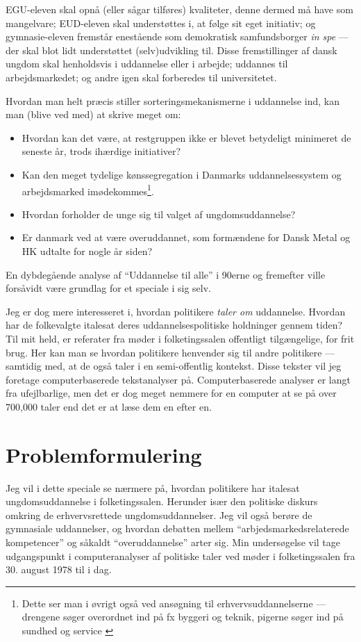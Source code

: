 EGU-eleven skal opnå (eller sågar tilføres) kvaliteter, denne dermed må have som mangelvare; EUD-eleven skal understøttes i, at følge sit eget initiativ; og gymnasie-eleven fremstår enestående som demokratisk samfundsborger \textit{in spe} — der skal blot lidt understøttet (selv)udvikling til.
Disse fremstillinger af dansk ungdom skal henholdsvis i uddannelse eller i arbejde; uddannes til arbejdsmarkedet; og andre igen skal forberedes til universitetet.

Hvordan man helt præcis stiller sorteringsmekanismerne i uddannelse ind, kan man (blive ved med) at skrive meget om:
\begin{itemize}
  \item
    Hvordan kan det være, at restgruppen ikke er blevet betydeligt minimeret de seneste år, trods ihærdige initiativer?
  \item
    Kan den meget tydelige kønssegregation i Danmarks uddannelsessystem og arbejdsmarked imødekommes\footnote{Dette ser man i øvrigt også ved ansøgning til erhvervsuddannelserne — drengene søger overordnet ind på fx byggeri og teknik, pigerne søger ind på sundhed og service \autocite[s. 48]{danmarksstatistikErhvervsuddannelserDanmark20192019}}.
  \item
    Hvordan forholder de unge sig til valget af ungdomsuddannelse?
  \item
    Er danmark ved at være overuddannet, som formændene for Dansk Metal og HK udtalte for nogle år siden? \autocite{simonsenLadOsGore2016}
\end{itemize}

En dybdegående analyse af “Uddannelse til alle” i 90erne og fremefter ville forsåvidt være grundlag for et speciale i sig selv.

Jeg er dog mere interesseret i, hvordan politikere \textit{taler om} uddannelse.
Hvordan har de folkevalgte italesat deres uddannelsespolitiske holdninger gennem tiden?
Til mit held, er referater fra møder i folketingssalen offentligt tilgængelige, for frit brug.
Her kan man se hvordan politikere henvender sig til andre politikere — samtidig med, at de også taler i en semi-offentlig kontekst.
Disse tekster vil jeg foretage computerbaserede tekstanalyser på.
Computerbaserede analyser er langt fra ufejlbarlige, men det er dog meget nemmere for en computer at se på over 700,000 taler end det er at læse dem en efter en.

\chapter{Problemformulering}\label{chap:pf}
Jeg vil i dette speciale se nærmere på, hvordan politikere har italesat ungdomsuddannelse i folketingssalen.
Herunder især den politiske diskurs omkring de erhvervsrettede ungdomsuddannelser.
Jeg vil også berøre de gymnasiale uddannelser, og hvordan debatten mellem “arbjedsmarkedsrelaterede kompetencer” og såkaldt “overuddannelse” arter sig.
Min undersøgelse vil tage udgangspunkt i computeranalyser af politiske taler ved møder i folketingssalen fra 30. august 1978 til i dag.

